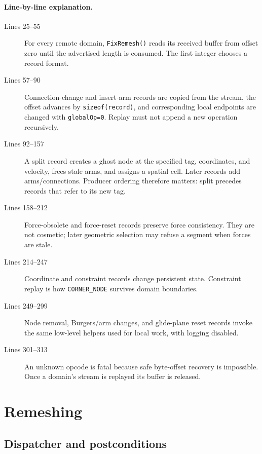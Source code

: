 \documentclass[11pt]{article}
\newcommand{\code}[1]{\texorpdfstring{\nolinkurl{#1}}{#1}}
\begin{document}
\paragraph{Line-by-line explanation.}
\begin{description}
\item[Lines 25--55] For every remote domain, \code{FixRemesh()} reads its
received buffer from offset zero until the advertised length is consumed. The
first integer chooses a record format.
\item[Lines 57--90] Connection-change and insert-arm records are copied from
the stream, the offset advances by \code{sizeof(record)}, and corresponding
local endpoints are changed with \code{globalOp=0}. Replay must not append a
new operation recursively.
\item[Lines 92--157] A split record creates a ghost node at the specified
tag, coordinates, and velocity, frees stale arms, and assigns a spatial cell.
Later records add arms/connections. Producer ordering therefore matters:
split precedes records that refer to its new tag.
\item[Lines 158--212] Force-obsolete and force-reset records preserve force
consistency. They are not cosmetic; later geometric selection may refuse a
segment when forces are stale.
\item[Lines 214--247] Coordinate and constraint records change persistent
state. Constraint replay is how \code{CORNER_NODE} survives domain boundaries.
\item[Lines 249--299] Node removal, Burgers/arm changes, and glide-plane reset
records invoke the same low-level helpers used for local work, with logging
disabled.
\item[Lines 301--313] An unknown opcode is fatal because safe byte-offset
recovery is impossible. Once a domain's stream is replayed its buffer is
released.
\end{description}

\section{Remeshing}

\subsection{Dispatcher and postconditions}


\end{document}
